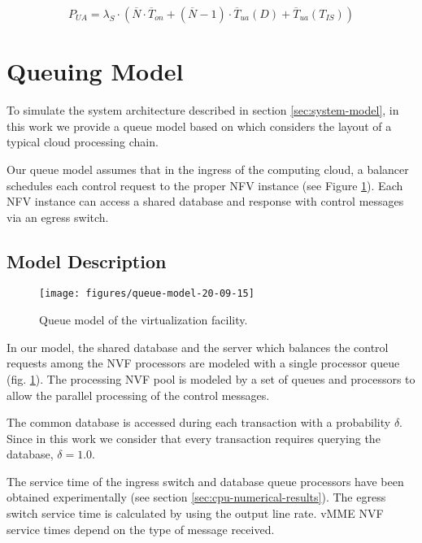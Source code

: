 \documentclass[conference]{IEEEtran}
\begin{document}
\begin{equation}P_{UA}=\lambda_{S} \cdot (\overline{N}\cdot \overline{T}_{on}+(\overline{N}-1)\cdot \overline{T}_{ua}(D)+\overline{T}_{ua}(T_{IS}))
\label{eq:pa}
\end{equation}







   
\section{Queuing Model}
\label{sec:queuing-model}

  To simulate the system architecture described in section \ref{sec:system-model}, in this work we provide a queue model based on \cite{Vilaplana2014} which considers the layout of a typical cloud processing chain. 

 Our queue model assumes that in the ingress of the computing cloud, a balancer schedules each control request to the proper NFV instance  (see Figure \ref{fig:nfvqueue}). Each NFV instance can access a shared database and response with control messages via an egress switch.
 
\subsection{Model Description}



\begin{figure}[t]
\begin{center}
\texttt{[image: figures/queue-model-20-09-15]}
\end{center}
\caption{Queue model of the virtualization facility.}
\label{fig:nfvqueue}
\end{figure}


 In our model, the shared database and the server which balances the control requests among the NVF processors are modeled with a single processor queue (fig. \ref{fig:nfvqueue}). The processing NVF pool is modeled by a set of queues and processors to allow the parallel processing of the control messages. 


 The common database is accessed during each transaction with a probability $\delta$. Since in this work we consider that every transaction requires querying the database, $\delta=1.0$.
 
  The service time of the ingress switch and database queue processors have been obtained experimentally (see section \ref{sec:cpu-numerical-results}). The egress switch service time is calculated by using the output line rate. vMME NVF service times depend on the type of message received. 
\end{document}

